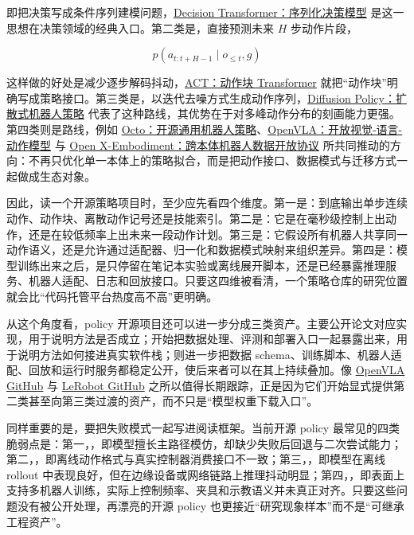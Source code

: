 即把决策写成条件序列建模问题，\href{https://arxiv.org/abs/2106.01345}{Decision Transformer：序列化决策模型} 是这一思想在决策领域的经典入口。第二类是\texttt{}，直接预测未来 \(H\) 步动作片段，

\begin{equation*}
p(a_{t:t+H-1} \mid o_{\le t}, g)
\end{equation*}

这样做的好处是减少逐步解码抖动，\href{https://arxiv.org/abs/2304.13705}{ACT：动作块 Transformer} 就把“动作块”明确写成策略接口。第三类是\texttt{}，以迭代去噪方式生成动作序列，\href{https://arxiv.org/abs/2303.04137}{Diffusion Policy：扩散式机器人策略} 代表了这种路线，其优势在于对多峰动作分布的刻画能力更强。第四类则是\texttt{}路线，例如 \href{https://arxiv.org/abs/2405.12213}{Octo：开源通用机器人策略}、\href{https://arxiv.org/abs/2406.09246}{OpenVLA：开放视觉-语言-动作模型} 与 \href{https://arxiv.org/abs/2310.08864}{Open X-Embodiment：跨本体机器人数据开放协议} 所共同推动的方向：不再只优化单一本体上的策略拟合，而是把动作接口、数据模式与迁移方式一起做成生态对象。

因此，读一个开源策略项目时，至少应先看四个维度。第一是\texttt{}：到底输出单步连续动作、动作块、离散动作记号还是技能索引。第二是\texttt{}：它是在毫秒级控制上出动作，还是在较低频率上出未来一段动作计划。第三是\texttt{}：它假设所有机器人共享同一动作语义，还是允许通过适配器、归一化和数据模式映射来组织差异。第四是\texttt{}：模型训练出来之后，是只停留在笔记本实验或离线展开脚本，还是已经暴露推理服务、机器人适配、日志和回放接口。只要这四维被看清，一个策略仓库的研究位置就会比“代码托管平台热度高不高”更明确。

从这个角度看，policy 开源项目还可以进一步分成三类资产。\texttt{}主要公开论文对应实现，用于说明方法是否成立；\texttt{}开始把数据处理、评测和部署入口一起暴露出来，用于说明方法如何接进真实软件栈；\texttt{}则进一步把数据 schema、训练脚本、机器人适配、回放和运行时服务都稳定公开，使后来者可以在其上持续叠加。像 \href{https://github.com/openvla/openvla}{OpenVLA GitHub} 与 \href{https://github.com/huggingface/lerobot}{LeRobot GitHub} 之所以值得长期跟踪，正是因为它们开始显式提供第二类甚至向第三类过渡的资产，而不只是“模型权重下载入口”。

同样重要的是，要把失败模式一起写进阅读框架。当前开源 policy 最常见的四类脆弱点是：第一，\texttt{}，即模型擅长主路径模仿，却缺少失败后回退与二次尝试能力；第二，\texttt{}，即离线动作格式与真实控制器消费接口不一致；第三，\texttt{}，即模型在离线 rollout 中表现良好，但在边缘设备或网络链路上推理抖动明显；第四，\texttt{}，即表面上支持多机器人训练，实际上控制频率、夹具和示教语义并未真正对齐。只要这些问题没有被公开处理，再漂亮的开源 policy 也更接近“研究现象样本”而不是“可继承工程资产”。

